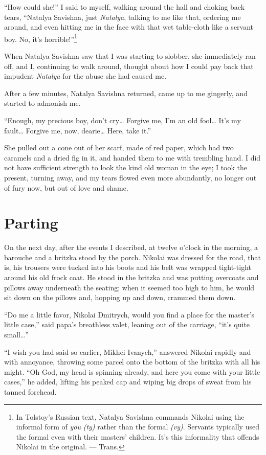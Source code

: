 ``How could she!'' I said to myself, walking around the hall and choking back tears, ``Natalya Savishna, just \emph{Natalya}, talking to me like that, ordering me around, and even hitting me in the face with that wet table-cloth like a servant boy. No, it's horrible!''\footnote{In Tolstoy's Russian text, Natalya Savishna commands Nikolai using the informal form of \textit{you} \textit{(ty)} rather than the formal \textit{(vy)}. Servants typically used the formal even with their masters' children. It's this informality that offends Nikolai in the original. --- Trans.}

When Natalya Savishna saw that I was starting to slobber, she immediately ran off, and I, continuing to walk around, thought about how I could pay back that impudent \emph{Natalya} for the abuse she had caused me.

After a few minutes, Natalya Savishna returned, came up to me gingerly, and started to admonish me.

``Enough, my precious boy, don't cry\ldots{} Forgive me, I'm an old fool\ldots{} It's my fault\ldots{} Forgive me, now, dearie\ldots{} Here, take it.'' %

She pulled out a cone out of her scarf, made of red paper, which had two caramels and a dried fig in it, and handed them to me with trembling hand. I did not have sufficient strength to look the kind old woman in the eye; I took the present, turning away, and my tears flowed even more abundantly, no longer out of fury now, but out of love and shame.

\chapter{Parting}

On the next day, after the events I described, at twelve o'clock in the morning, a barouche and a britzka stood by the porch. Nikolai was dressed for the road, that is, his trousers were tucked into his boots and his belt was wrapped tight-tight around his old frock coat. He stood in the britzka and was putting overcoats and pillows away underneath the seating; when it seemed too high to him, he would sit down on the pillows and, hopping up and down, crammed them down.

``Do me a little favor, Nikolai Dmitrych, would you find a place for the master's little case,'' said papa's breathless valet, leaning out of the carriage, ``it's quite small\ldots{}'' %

``I wish you had said so earlier, Mikhei Ivanych,'' answered Nikolai rapidly and with annoyance, throwing some parcel onto the bottom of the britzka with all his might. ``Oh God, my head is spinning already, and here you come with your little cases,'' he added, lifting his peaked cap and wiping big drops of sweat from his tanned forehead. %

